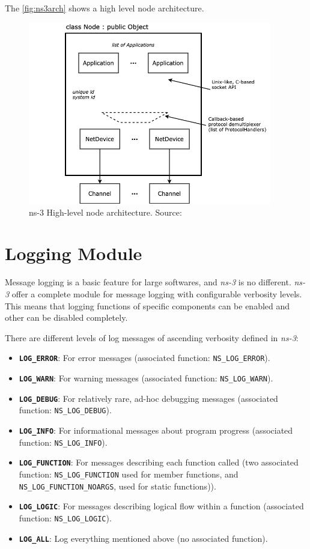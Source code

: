 The \autoref{fig:ns3arch} shows a high level node architecture.

\begin{figure}[h]
  \centering
  \includegraphics[width=0.95\textwidth]{img/node.png}
  \caption{ns-3 High-level node architecture. Source:\cite{ns3} }
  \label{fig:ns3arch}
\end{figure}

\section{Logging Module}
Message logging is a basic feature for large softwares, and \textit{ns-3} is no different. \textit{ns-3} 
offer a complete module for message logging with configurable verbosity levels. This means that logging 
functions of specific components can be enabled and other can be disabled completely.

There are different levels of log messages of ascending verbosity defined in \textit{ns-3}:

\begin{itemize}[topsep=0pt]
  \item \textbf{\texttt{LOG\_ERROR}}: For error messages (associated function: \texttt{NS\_LOG\_ERROR}).
  \item \textbf{\texttt{LOG\_WARN}}: For warning messages (associated function: \texttt{NS\_LOG\_WARN}).
  \item \textbf{\texttt{LOG\_DEBUG}}: For relatively rare, ad-hoc debugging messages (associated function: \texttt{NS\_LOG\_DEBUG}).
  \item \textbf{\texttt{LOG\_INFO}}: For informational messages about program progress (associated function: \texttt{NS\_LOG\_INFO}).
  \item \textbf{\texttt{LOG\_FUNCTION}}: For messages describing each function called (two associated function: \texttt{NS\_LOG\_FUNCTION}
  used for member functions, and \texttt{NS\_LOG\_FUNCTION\_NOARGS}, used for static functions)).
  \item \textbf{\texttt{LOG\_LOGIC}}: For messages describing logical flow within a function (associated function: \texttt{NS\_LOG\_LOGIC}).
  \item \textbf{\texttt{LOG\_ALL}}: Log everything mentioned above (no associated function).
\end{itemize}

